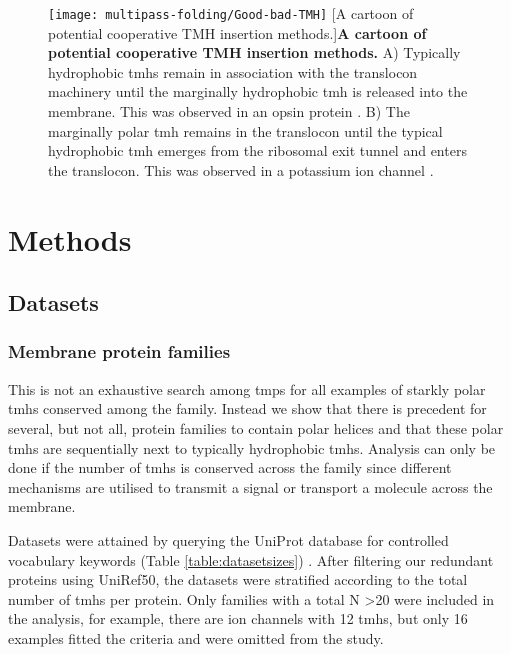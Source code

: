 \begin{figure}[!ht]
\centering
\texttt{[image: multipass-folding/Good-bad-TMH]}
		[A cartoon of potential cooperative TMH insertion methods.]{\textbf{A cartoon of potential cooperative TMH insertion methods.}
    A) Typically hydrophobic \gls{tmh}s remain in association with the translocon machinery until the marginally hydrophobic \gls{tmh} is released into the membrane.
    This was observed in an opsin protein \cite{Ismail2008}.
    B) The marginally polar \gls{tmh} remains in the translocon until the typical hydrophobic \gls{tmh} emerges from the ribosomal exit tunnel and enters the translocon.
    This was observed in a potassium ion channel \cite{Zhang2007, Cymer2015}.
    }

\label{fig:Good-bad-TMH}
\end{figure}


\section{Methods}
\subsection{Datasets}
\subsubsection{Membrane protein families}
This is not an exhaustive search among \gls{tmp}s for all examples of starkly polar \gls{tmh}s conserved among the family.
Instead we show that there is precedent for several, but not all, protein families to contain polar helices and that these polar \gls{tmh}s are sequentially next to typically hydrophobic \gls{tmh}s.
Analysis can only be done if the number of \gls{tmh}s is conserved across the family since different mechanisms are utilised to transmit a signal or transport a molecule across the membrane.

Datasets were attained by querying the UniProt database for controlled vocabulary keywords (Table \ref{table:datasetsizes}) \cite{TheUniProtConsortium2014}.
After filtering our redundant proteins using UniRef50, the datasets were stratified according to the total number of \gls{tmh}s per protein.
Only families with a total N \textgreater  20 were included in the analysis, for example, there are ion channels with 12 \gls{tmh}s, but only 16 examples fitted the criteria and were omitted from the study.



